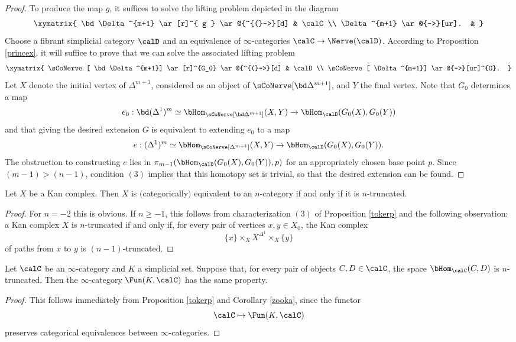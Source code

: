 \begin{proof}
To produce the map $g$, it suffices to solve the lifting problem depicted in the diagram
$$ \xymatrix{ \bd \Delta^{m+1} \ar[r]^{ g } \ar@{^{(}->}[d] & \calC \\
\Delta^{m+1} \ar@{-->}[ur]. & }$$
Choose a fibrant simplicial category $\calD$ and an equivalence
of $\infty$-categories $\calC \rightarrow \Nerve(\calD)$.
According to Proposition \ref{princex}, it will suffice to prove that we can solve 
the associated lifting problem
$$ \xymatrix{ \sCoNerve[ \bd \Delta^{m+1}] \ar[r]^{G_0} \ar@{^{(}->}[d] & \calD \\
\sCoNerve[ \Delta^{m+1}] \ar@{-->}[ur]^{G}. }$$ 
Let $X$ denote the initial vertex of $\Delta^{m+1}$, considered as an object of
$\sCoNerve[\bd \Delta^{m+1}]$, and $Y$ the final vertex. Note that $G_0$
determines a map
$$ e_0: \bd (\Delta^1)^m \simeq \bHom_{ \sCoNerve[ \bd \Delta^{m+1}]}(X,Y) \rightarrow
\bHom_{\calD}(G_0(X), G_0(Y))$$
and that giving the desired extension $G$ is equivalent to extending $e_0$ to a map
$$ e: (\Delta^1)^m \simeq \bHom_{ \sCoNerve[ \Delta^{m+1}]}(X,Y) \rightarrow
\bHom_{ \calD}(G_0(X), G_0(Y)).$$
The obstruction to constructing $e$ lies in 
$\pi_{m-1}(\bHom_{\calD}(G_0(X), G_0(Y)), p)$ for an appropriately chosen base point
$p$. Since $(m-1) > (n-1)$, condition $(3)$ implies that this homotopy set is trivial, so that
the desired extension can be found.
\end{proof}

\begin{corollary}
Let $X$ be a Kan complex. Then $X$ is $($categorically$)$ equivalent to an $n$-category if and only if it is $n$-truncated.
\end{corollary}

\begin{proof}
For $n=-2$ this is obvious. If $n \geq -1$, this follows from characterization $(3)$ of Proposition \ref{tokerp} and the following observation: a Kan complex $X$ is $n$-truncated if and only if, for every pair of vertices $x,y \in X_0$, the Kan complex
$$\{x\} \times_{X}  X^{\Delta^1} \times_{X} \{y\}$$
of paths from $x$ to $y$ is $(n-1)$-truncated.
\end{proof}

\begin{corollary}\label{zook}
Let $\calC$ be an $\infty$-category and $K$ a simplicial set. Suppose that, for every pair of objects
$C,D \in \calC$, the space $\bHom_{\calC}(C,D)$ is $n$-truncated. Then the
$\infty$-category $\Fun(K,\calC)$ has the same property.
\end{corollary}

\begin{proof}
This follows immediately from Proposition \ref{tokerp} and Corollary \ref{zooka}, since the functor
$$ \calC \mapsto \Fun(K,\calC)$$ preserves categorical equivalences between $\infty$-categories.
\end{proof}
